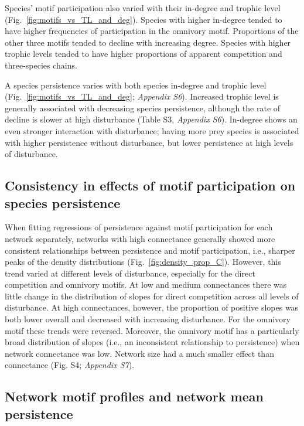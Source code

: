 \documentclass[12pt]{article}
\begin{document}
\begin{spacing}{2.0}
       Species' motif participation also varied with their in-degree and trophic level (Fig.~\ref{fig:motifs_vs_TL_and_deg}).
       Species with higher in-degree tended to have higher frequencies of participation in the omnivory motif. Proportions of the other three motifs tended to decline with increasing degree.
       Species with higher trophic levels tended to have higher proportions of apparent competition and three-species chains. 
        
       A species persistence varies with both species in-degree and trophic level (Fig.~\ref{fig:motifs_vs_TL_and_deg}; \emph{Appendix S6}). Increased trophic level is generally associated with decreasing species persistence, although the rate of decline is slower at high disturbance (Table S3, \emph{Appendix S6}).
       In-degree shows an even stronger interaction with disturbance; having more prey species is associated with higher persistence without disturbance, but lower persistence at high levels of disturbance.
        
        
    \subsection*{Consistency in effects of motif participation on species persistence}

        
        When fitting regressions of persistence against motif participation for each network separately, networks with high connectance generally showed more consistent relationships between persistence and motif participation, i.e., sharper peaks of the density distributions (Fig.~\ref{fig:density_prop_C}).
        However, this trend varied at different levels of disturbance, especially for the direct competition and omnivory motifs.
        At low and medium connectances there was little change in the distribution of slopes for direct competition across all levels of disturbance. 
        At high connectances, however, the proportion of positive slopes was both lower overall and decreased with increasing disturbance. 
        For the omnivory motif these trends were reversed. 
        Moreover, the omnivory motif has a particularly broad distribution of slopes (i.e., an inconsistent relationship to persistence) when network connectance was low. 
        Network size had a much smaller effect than connectance (Fig. S4; \emph{Appendix S7}).


    \subsection*{Network motif profiles and network mean persistence}
    

\end{spacing}
\end{document}
